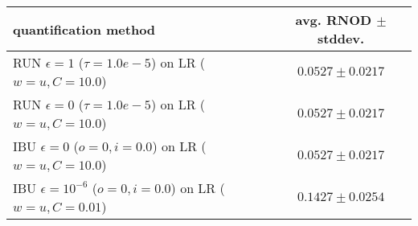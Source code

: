 \begin{tabular}{lc}
  \toprule
  quantification method & avg. RNOD $\pm$ stddev. \\
  \midrule
  RUN $\epsilon=1$ ($\tau=1.0e-5$) on LR ($w=u, C=10.0$) & $\mathbf{0.0527 \pm 0.0217}$ \\
  RUN $\epsilon=0$ ($\tau=1.0e-5$) on LR ($w=u, C=10.0$) & $0.0527 \pm 0.0217$ \\
  IBU $\epsilon=0$ ($o=0, i=0.0$) on LR ($w=u, C=10.0$) & $0.0527 \pm 0.0217$ \\
  IBU $\epsilon=10^{-6}$ ($o=0, i=0.0$) on LR ($w=u, C=0.01$) & $0.1427 \pm 0.0254$ \\
  \bottomrule
\end{tabular}
